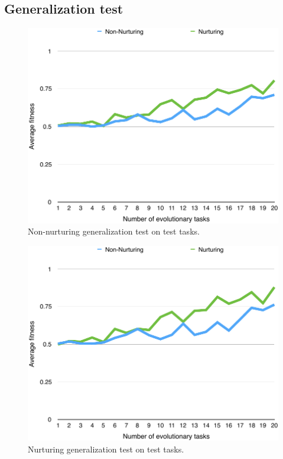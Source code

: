 \documentclass[master]{outhesis}
\begin{document}
\subsection{Generalization test}

\begin{figure}[H]
	\centering
	\includegraphics{NonNurturingGeneralizationTestPlot.pdf}
	\caption{Non-nurturing generalization test on test tasks.}
\end{figure}

\begin{figure}[H]
	\centering
	\includegraphics{NurturingGeneralizationTestPlot.pdf}
	\caption{Nurturing generalization test on test tasks.}
\end{figure}
\end{document}
